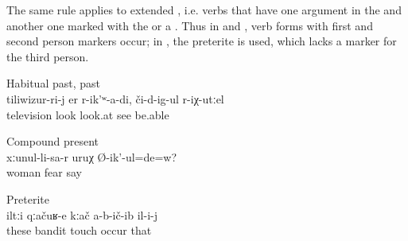 The same rule applies to extended , i.e. verbs that have one argument in the  and another one marked with the  or a . Thus in  and , verb forms with first and second person markers occur; in , the preterite is used, which lacks a marker for the third person.
%
\begin{exe}
		\ex	Habitual past,  past\\	\label{ex:‎I would watch TV if I were able to see habitual conditional past}
		\gll	tiliwizur-ri-j	er	r-ik'ʷ-a-di,	či-d-ig-ul	r-iχ-utːel\\
			television	look	look.at	see	be.able\\
		\glt	{}

		\ex	Compound present\\	\label{ex:Are you afraid of your wife compound present}
		\gll	xːunul-li-sa-r	uruχ	Ø-ik'-ul=de=w?\\
			woman	fear	say\\
		\glt	{}

		\ex	Preterite\\	\label{ex:‎‎‎The bandits did not touch him preterite}
		\gll	iltːi	qːačuʁ-e	kːač	a-b-ič-ib	il-i-j\\
			these	bandit	touch	occur	that\\
		\glt	{}
\end{exe}

